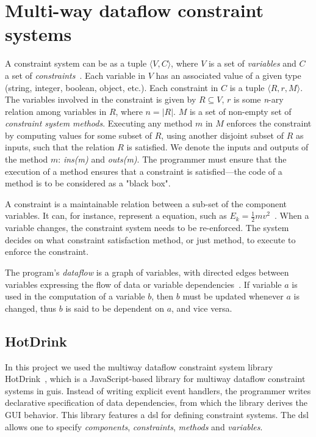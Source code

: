 \chapter{Multi-way dataflow constraint systems}
\label{chap:constraint-systems}

A constraint system can be as a tuple ${\langle V, C \rangle}$, where $V$ is a set of \textit{variables} and $C$ a set of \textit{constraints}~\cite{jarvi_algorithms_2009}. Each variable in $V$ has an associated value of a given type (string, integer, boolean, object, etc.). Each constraint in $C$ is a tuple ${\langle R, r, M \rangle}$. The variables involved in the constraint is given by ${R \subseteq V}$, $r$ is some \textit{n}-ary relation among variables in $R$, where ${n = \lvert R \rvert}$. $M$ is a set of non-empty set of \textit{constraint system methods}. Executing any method $m$ in $M$ enforces the constraint by computing values for some subset of $R$, using another disjoint subset of $R$ as inputs, such that the relation $R$ is satisfied. We denote the inputs and outputs of the method $m$: \textit{ins(m)} and \textit{outs(m)}. The programmer must ensure that the execution of a method ensures that a constraint is satisfied---the code of a method is to be considered as a "black box". 

A constraint is a maintainable relation between a sub-set of the component variables. It can, for instance, represent a equation, such as  $E_k = \frac{1}{2}mv^2$~\cite{svartveit2021multithreaded}. When a variable changes, the constraint system needs to be re-enforced. The system decides on what constraint satisfaction method, or just method, to execute to enforce the constraint.

The program's \textit{dataflow} is a graph of variables, with directed edges between variables expressing the flow of data or variable dependencies~\cite{stokke2020declaratively}. If variable $a$ is used in the computation of a variable $b$, then $b$ must be updated whenever $a$ is changed, thus $b$ is said to be dependent on $a$, and vice versa.

\section{HotDrink}
\label{sec:hotdrink}

In this project we used the multiway dataflow constraint system library 
HotDrink~\cite{HotDrink}, which is a JavaScript-based library for multiway dataflow constraint systems in \gls{gui}s. Instead of writing explicit event handlers, the programmer writes declarative specification of data dependencies, from which the library derives the GUI behavior. This library features a \gls{dsl} for defining constraint systems. The \gls{dsl} allows one to specify \emph{components}, \emph{constraints}, \emph{methods} and \emph{variables}. 

